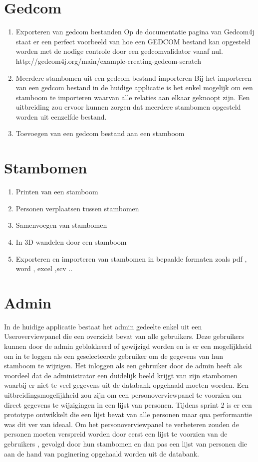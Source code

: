 \documentclass[pdftex,a4paper,12pt,twoside]{report}
\begin{document}
\section{Gedcom}
\begin{enumerate}
\item \label{it:first} Exporteren van gedcom bestanden
	Op de documentatie pagina van Gedcom4j staat er een perfect voorbeeld van hoe een GEDCOM bestand kan opgesteld worden met de nodige controle door een gedcomvalidator vanaf nul.
	http://gedcom4j.org/main/example-creating-gedcom-scratch
\item \label{it:first}  Meerdere stambomen uit een gedcom bestand importeren
	Bij het importeren van een gedcom bestand in de huidige applicatie is het enkel mogelijk om een stamboom te importeren waarvan alle relaties aan elkaar geknoopt zijn.
	Een uitbreiding zou ervoor kunnen zorgen dat meerdere stambomen opgesteld worden uit eenzelfde bestand.
\item \label{it:first} Toevoegen van een gedcom bestand aan een stamboom
\end{enumerate}

 
\section{Stambomen}
\begin{enumerate}
\item \label{it:first} Printen van een stamboom
\item \label{it:first} Personen verplaatsen tussen stambomen
\item \label{it:first} Samenvoegen van stambomen
\item \label{it:first} In 3D wandelen door een stamboom
\item \label{it:first} Exporteren en importeren van stambomen in bepaalde formaten zoals pdf , word , excel ,scv ..
\end{enumerate}

\section{Admin}

In de huidige applicatie bestaat het admin gedeelte enkel uit een Useroverviewpanel die een overzicht bevat van alle gebruikers.
Deze gebruikers kunnen door de admin geblokkeerd of gewijzigd worden en is er een mogelijkheid om in te loggen als een geselecteerde gebruiker om de gegevens van hun stamboom te wijzigen.
Het inloggen als een gebruiker door de admin heeft als voordeel dat de administrator een duidelijk beeld krijgt van zijn stambomen waarbij er niet te veel gegevens uit de databank opgehaald moeten worden.
Een uitbreidingsmogelijkheid zou zijn om een personoverviewpanel te voorzien om direct gegevens te wijzigingen in een lijst van personen.
Tijdens sprint 2 is er een prototype ontwikkelt die een lijst bevat van alle personen maar qua performantie was dit ver van ideaal.
Om het personoverviewpanel te verbeteren zouden de personen moeten verspreid worden door eerst een lijst te voorzien van de gebruikers , gevolgd door hun stambomen en dan pas een lijst van personen die aan de hand van paginering opgehaald worden uit de databank. 
\end{document}
